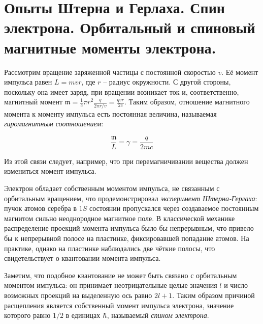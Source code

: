 \section{Опыты Штерна и Герлаха. Спин электрона. Орбитальный и спиновый магнитные моменты электрона.}

Рассмотрим вращение заряженной частицы с постоянной скоростью $v$. Её момент импульса равен $L = m v r$, где $r$ -- радиус окружности. С другой стороны, поскольку она имеет заряд, при вращении возникает ток и, соответственно, магнитный момент $\mathfrak{m} = \frac{1}{c} \pi r^2 \frac{q}{2 \pi r / v} = \frac{q v r}{2 c}$. Таким образом, отношение магнитного момента к моменту импульса есть постоянная величина, называемая \textit{гиромагнитным соотношением}:

\begin{equation}
    \frac{\mathfrak{m}}{L} = \gamma = \frac{q}{2 m c}
\end{equation}

\noindent
Из этой связи следует, например, что при перемагничивании вещества должен измениться момент импульса.

Электрон обладает собственным моментом импульса, не связанным с орбитальным вращением, что продемонстрировал \textit{эксперимент Штерна-Герлаха}: пучок атомов серебра в $1S$ состоянии пропускался через создаваемое постоянным магнитом сильно неоднородное магнитное поле. В классической механике распределение проекций момента импульса было бы непрерывным, что привело бы к непрерывной полосе на пластинке, фиксировавшей попадание атомов. На практике, однако на пластинке наблюдались две чёткие полосы, что свидетельствует о квантовании момента импульса.

\noindent
Заметим, что подобное квантование не может быть связано с орбитальным моментом импульса: он принимает неотрицательные целые значения $l$ и число возможных проекций на выделенную ось равно $2 l + 1$. Таким образом причиной расщепления является собственный момент импульса электрона, значение которого равно $1 / 2$ в единицах $\hbar$, называемый \textit{спином электрона}.